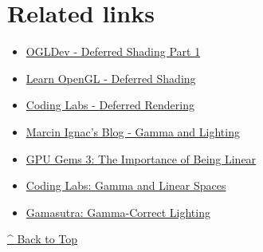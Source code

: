 \documentclass[11pt]{article}
\begin{document}
\section*{Related links}
\label{sec:org7f7b99b}
\begin{itemize}
\item \href{http://ogldev.atspace.co.uk/www/tutorial35/tutorial35.html}{OGLDev - Deferred Shading Part 1}
\item \href{https://learnopengl.com/\#!Advanced-Lighting/Deferred-Shading}{Learn OpenGL - Deferred Shading}
\item \href{http://www.codinglabs.net/tutorial\_simple\_def\_rendering.aspx}{Coding Labs - Deferred Rendering}
\item \href{http://marcinignac.com/blog/pragmatic-pbr-setup-and-gamma/}{Marcin Ignac's Blog - Gamma and Lighting}
\item \href{http://http.developer.nvidia.com/GPUGems3/gpugems3\_ch24.html}{GPU Gems 3: The Importance of Being Linear}
\item \href{http://www.codinglabs.net/article\_gamma\_vs\_linear.aspx}{Coding Labs: Gamma and Linear Spaces}
\item \href{http://www.gamasutra.com/blogs/DavidRosen/20100204/4322/GammaCorrect\_Lighting.php}{Gamasutra: Gamma-Correct Lighting}
\end{itemize}

\hyperref[orgd5ea0e3]{\^{} Back to Top}    
\end{document}
